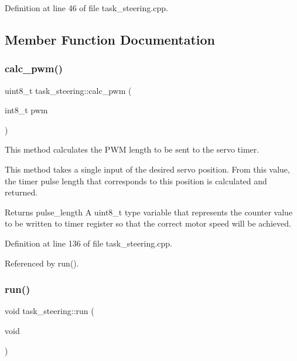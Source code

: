 Definition at line 46 of file task\+\_\+steering.\+cpp.



\subsection{Member Function Documentation}
\mbox{\label{classtask__steering_a6f33131ca25de22a81282b1142d939b3}} 
\subsubsection{\texorpdfstring{calc\+\_\+pwm()}{calc\_pwm()}}
{\footnotesize\ttfamily uint8\+\_\+t task\+\_\+steering\+::calc\+\_\+pwm (\begin{DoxyParamCaption}\item[{int8\+\_\+t}]{pwm }\end{DoxyParamCaption})\hspace{0.3cm}{\ttfamily [protected]}}



This method calculates the P\+WM length to be sent to the servo timer. 

This method takes a single input of the desired servo position. From this value, the timer pulse length that corresponds to this position is calculated and returned. \begin{DoxyReturn}{Returns}
pulse\+\_\+length A uint8\+\_\+t type variable that represents the counter value to be written to timer register so that the correct motor speed will be achieved. 
\end{DoxyReturn}


Definition at line 136 of file task\+\_\+steering.\+cpp.



Referenced by run().

\mbox{\label{classtask__steering_a223e9f1d50c0c48ff5326b7ae01ae689}} 
\subsubsection{\texorpdfstring{run()}{run()}}
{\footnotesize\ttfamily void task\+\_\+steering\+::run (\begin{DoxyParamCaption}\item[{void}]{ }\end{DoxyParamCaption})}



